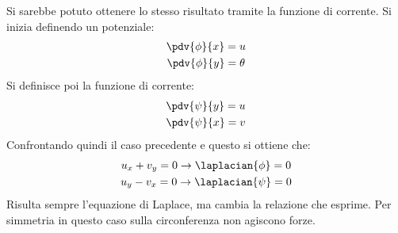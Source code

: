 %
Si sarebbe potuto ottenere lo stesso risultato tramite la funzione di corrente.
Si inizia definendo un potenziale:
%
	\begin{equation*}
		\begin{gathered}
			\pdv{\phi}{x} = u\\
			\pdv{\phi}{y} = \theta
		\end{gathered}
	\end{equation*}
%
Si definisce poi la funzione di corrente:
%
	\begin{equation*}
		\begin{gathered}
			\pdv{\psi}{y} = u\\
			\pdv{\psi}{x} = v
		\end{gathered}
	\end{equation*}
%
Confrontando quindi il caso precedente e questo si ottiene che:
%
	\begin{equation*}
		\begin{gathered}
			u_x + v_y = 0 \rightarrow \laplacian{\phi} = 0\\
			u_y - v_x = 0 \rightarrow \laplacian{\psi} = 0
		\end{gathered}
	\end{equation*}
%
Risulta sempre l'equazione di Laplace, ma cambia la relazione che esprime.
Per simmetria in questo caso sulla circonferenza non agiscono forze.

